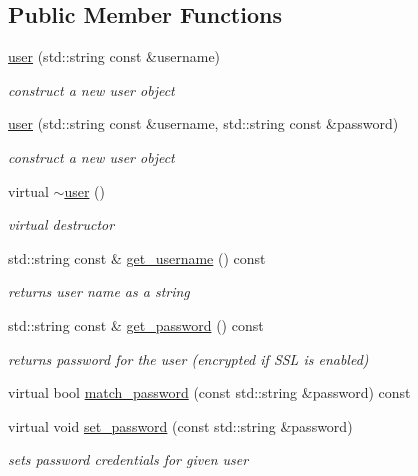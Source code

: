 \subsection*{Public Member Functions}
\begin{DoxyCompactItemize}
\item 
\hyperlink{classpion_1_1user_a7215ae3543a0fc3c8c68e4e20f67d542}{user} (std\-::string const \&username)
\begin{DoxyCompactList}\small\item\em construct a new user object \end{DoxyCompactList}\item 
\hyperlink{classpion_1_1user_a0d26edcf0b01dee7e3c4457ced9108d1}{user} (std\-::string const \&username, std\-::string const \&password)
\begin{DoxyCompactList}\small\item\em construct a new user object \end{DoxyCompactList}\item 
virtual \hyperlink{classpion_1_1user_adabb39ff720554fe13d8e93d7d647953}{$\sim$user} ()
\begin{DoxyCompactList}\small\item\em virtual destructor \end{DoxyCompactList}\item 
std\-::string const \& \hyperlink{classpion_1_1user_abb1f00fc40a240786ca3f4f0703866e6}{get\-\_\-username} () const 
\begin{DoxyCompactList}\small\item\em returns user name as a string \end{DoxyCompactList}\item 
std\-::string const \& \hyperlink{classpion_1_1user_ab88146712e075ec69d9dfc4f3ba7f5ae}{get\-\_\-password} () const 
\begin{DoxyCompactList}\small\item\em returns password for the user (encrypted if S\-S\-L is enabled) \end{DoxyCompactList}\item 
virtual bool \hyperlink{classpion_1_1user_af3f539ee4d00a29780d2c6e1c4396aaf}{match\-\_\-password} (const std\-::string \&password) const 
\item 
virtual void \hyperlink{classpion_1_1user_aff790ab701624dce1a686737f391b6bc}{set\-\_\-password} (const std\-::string \&password)
\begin{DoxyCompactList}\small\item\em sets password credentials for given user \end{DoxyCompactList}\end{DoxyCompactItemize}
